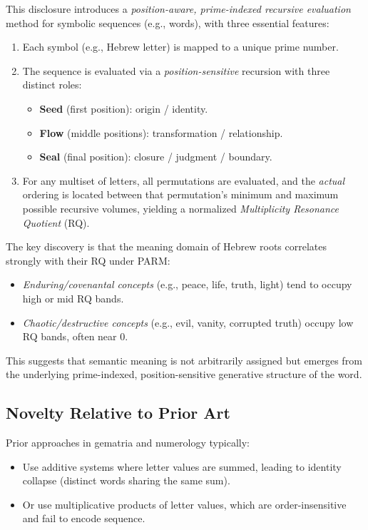 \documentclass[11pt]{article}
\begin{document}
This disclosure introduces a \emph{position-aware, prime-indexed recursive evaluation} method for symbolic sequences (e.g., words), with three essential features:
\begin{enumerate}[label=(\alph*)]
    \item Each symbol (e.g., Hebrew letter) is mapped to a unique prime number.
    \item The sequence is evaluated via a \emph{position-sensitive} recursion with three distinct roles:
    \begin{itemize}
        \item \textbf{Seed} (first position): origin / identity.
        \item \textbf{Flow} (middle positions): transformation / relationship.
        \item \textbf{Seal} (final position): closure / judgment / boundary.
    \end{itemize}
    \item For any multiset of letters, all permutations are evaluated, and the \emph{actual} ordering is located between that permutation's minimum and maximum possible recursive volumes, yielding a normalized \emph{Multiplicity Resonance Quotient} (RQ).
\end{enumerate}

The key discovery is that the meaning domain of Hebrew roots correlates strongly with their RQ under PARM:
\begin{itemize}
    \item \emph{Enduring/covenantal concepts} (e.g., peace, life, truth, light) tend to occupy high or mid RQ bands.
    \item \emph{Chaotic/destructive concepts} (e.g., evil, vanity, corrupted truth) occupy low RQ bands, often near $0$.
\end{itemize}

This suggests that semantic meaning is not arbitrarily assigned but emerges from the underlying prime-indexed, position-sensitive generative structure of the word.

\subsection{Novelty Relative to Prior Art}

Prior approaches in gematria and numerology typically:
\begin{itemize}
    \item Use additive systems where letter values are summed, leading to identity collapse (distinct words sharing the same sum).
    \item Or use multiplicative products of letter values, which are order-insensitive and fail to encode sequence.
\end{itemize}
\end{document}
